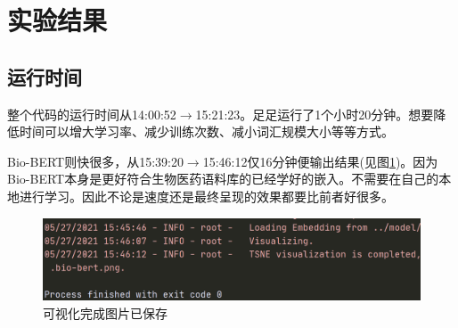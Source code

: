 \documentclass[12pt]{article}
\begin{document}
\section{实验结果}
\subsection{运行时间}
整个代码的运行时间从14:00:52$\rightarrow$15:21:23。足足运行了1个小时20分钟。想要降低时间可以增大学习率、减少训练次数、减小词汇规模大小等等方式。\par
Bio-BERT则快很多，从15:39:20$\rightarrow$15:46:12仅16分钟便输出结果(见图\ref{1121})。因为Bio-BERT本身是更好符合生物医药语料库的已经学好的嵌入。不需要在自己的本地进行学习。因此不论是速度还是最终呈现的效果都要比前者好很多。
\begin{figure}[H]
  \centering
  \includegraphics[scale=0.3]{./picture/result1.png} %
  \caption{可视化完成图片已保存} %
  \label{1121} %
\end{figure}
\end{document}
